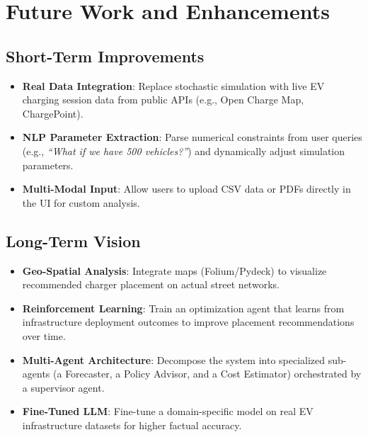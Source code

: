 \documentclass[12pt,a4paper]{article}
\begin{document}
\newpage

\section{Future Work and Enhancements}

\subsection{Short-Term Improvements}
\begin{itemize}
    \item \textbf{Real Data Integration}: Replace stochastic simulation with live EV charging session data from public APIs (e.g., Open Charge Map, ChargePoint).
    \item \textbf{NLP Parameter Extraction}: Parse numerical constraints from user queries (e.g., \textit{``What if we have 500 vehicles?''}) and dynamically adjust simulation parameters.
    \item \textbf{Multi-Modal Input}: Allow users to upload CSV data or PDFs directly in the UI for custom analysis.
\end{itemize}

\subsection{Long-Term Vision}
\begin{itemize}
    \item \textbf{Geo-Spatial Analysis}: Integrate maps (Folium/Pydeck) to visualize recommended charger placement on actual street networks.
    \item \textbf{Reinforcement Learning}: Train an optimization agent that learns from infrastructure deployment outcomes to improve placement recommendations over time.
    \item \textbf{Multi-Agent Architecture}: Decompose the system into specialized sub-agents (a Forecaster, a Policy Advisor, and a Cost Estimator) orchestrated by a supervisor agent.
    \item \textbf{Fine-Tuned LLM}: Fine-tune a domain-specific model on real EV infrastructure datasets for higher factual accuracy.
\end{itemize}

\newpage

\end{document}

